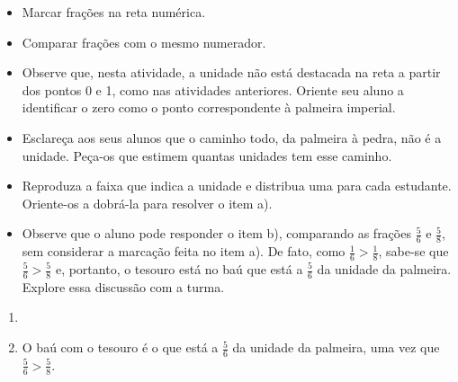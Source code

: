 \begin{atividade}\label{chap3-ativ7}
\objetivos
\begin{itemize} %
\item Marcar frações na reta numérica.
\item Comparar frações com o mesmo numerador.
\end{itemize} %

\discussoes
\begin{itemize} %
    \item Observe que, nesta atividade, a unidade não está destacada na reta a partir dos pontos 0 e 1, como nas atividades anteriores. Oriente seu aluno a identificar o zero como o ponto correspondente à palmeira imperial.
    \item Esclareça aos seus alunos que o caminho todo, da palmeira à pedra, não é a unidade. Peça-os que estimem quantas unidades tem esse caminho.
    \item Reproduza a faixa que indica a unidade e distribua uma para cada estudante. Oriente-os a dobrá-la para resolver o item a).
    \item Observe que o aluno pode responder o item b), comparando as frações $\frac{5}{6}$ e $\frac{5}{8}$, sem considerar a marcação feita no item a). De fato, como $\frac{1}{6} > \frac{1}{8}$, sabe-se que $\frac{5}{6} > \frac{5}{8}$ e, portanto, o tesouro está no baú que está a $\frac{5}{6}$ da unidade da palmeira.
Explore essa discussão com a turma.

\end{itemize} %

\solucao
\begin{enumerate}
\item {}
{
}

\item O baú com o tesouro é o que está a $\frac{5}{6}$ da unidade da palmeira, uma vez que $\frac{5}{6} > \frac{5}{8}$. 
\end{enumerate}

\end{atividade}

